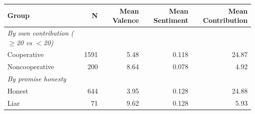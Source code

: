 \begin{tabular}{lrrrr}
  \toprule
  Group & N & Mean Valence & Mean Sentiment & Mean Contribution \\
  \midrule
  \emph{By own contribution ($\geq$20 vs $<$20)} \\
  Cooperative & 1591 & 5.48 & 0.118 & 24.87 \\
  Noncooperative & 200 & 8.64 & 0.078 & 4.92 \\
  \midrule
  \emph{By promise honesty} \\
  Honest & 644 & 3.95 & 0.128 & 24.88 \\
  Liar & 71 & 9.62 & 0.128 & 5.93 \\
  \bottomrule
\end{tabular}

